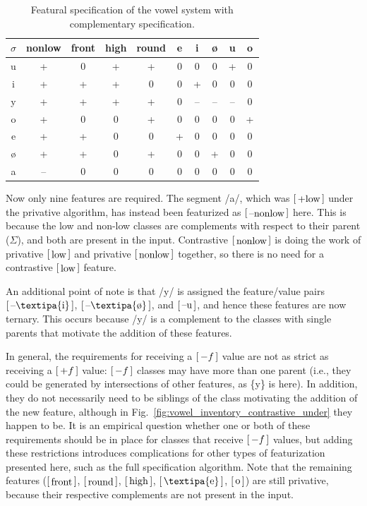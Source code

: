 \documentclass[12pt, oneside]{article}   	%
\newcommand{\featmat}[1]
{$\begin{bsmallmatrix*}[l]\text{\normalsize #1}\end{bsmallmatrix*}$}
\begin{document}
\begin{table}[htb!]
	\centering
	\begin{tabular} {|c||c|c|c|c|c|c|c|c|c|}
		\hline
		$\sigma$ & nonlow & front & high & round & e & i & \o & u & o \\ \hline
		u & + & 0 & + & + & 0 & 0 & 0 & + & 0 \\
		i & + & + & + & 0 & 0 & + & 0 & 0 & 0 \\
		y & + & + & + & + & 0 & -- & -- & -- & 0 \\
		o & + & 0 & 0 & + & 0 & 0 & 0 & 0 & + \\
		e & + & + & 0 & 0 & + & 0 & 0 & 0 & 0 \\
		\o & + & + & 0 & + & 0 & 0 & + & 0 & 0 \\
		a & -- & 0 & 0 & 0 & 0 & 0 & 0 & 0 & 0 \\
		\hline
	\end{tabular}
	\caption{Featural specification of the vowel system with complementary specification.}
	\label{table:contrastive_under_vowel_features}
\end{table}

Now only nine features are required. The segment /a/, which was \featmat{+low} under the privative algorithm, has instead been featurized as \featmat{--nonlow} here. This is because the low and non-low classes are complements with respect to their parent ($\Sigma$), and both are present in the input. Contrastive \featmat{nonlow} is doing the work of privative \featmat{low} and privative \featmat{nonlow} together, so there is no need for a contrastive \featmat{low} feature.

An additional point of note is that /y/ is assigned the feature/value pairs \featmat{--\textipa{i}}, \featmat{--\textipa{\o}}, and \featmat{--u}, and hence these features are now ternary. This occurs because /y/ is a complement to the classes with single parents that motivate the addition of these features.

In general, the requirements for receiving a \featmat{$-f$} value are not as strict as receiving a \featmat{$+f$} value: \featmat{$-f$} classes may have more than one parent (i.e., they could be generated by intersections of other features, as \{y\} is here). In addition, they do not necessarily need to be siblings of the class motivating the addition of the new feature, although in Fig.~\ref{fig:vowel_inventory_contrastive_under} they happen to be. It is an empirical question whether one or both of these requirements should be in place for classes that receive \featmat{$-f$} values, but adding these restrictions introduces complications for other types of featurization presented here, such as the full specification algorithm. Note that the remaining features (\featmat{front}, \featmat{round}, \featmat{high}, \featmat{\textipa{e}}, \featmat{o}) are still privative, because their respective complements are not present in the input.
\end{document}
